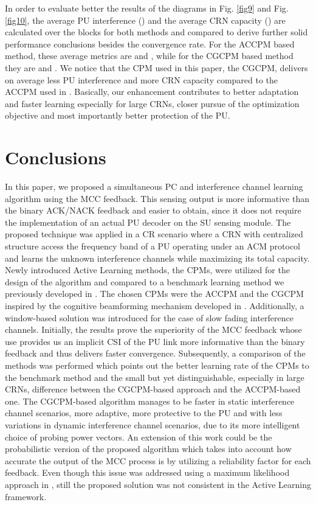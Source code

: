 \documentclass[journal]{IEEEtran}
\begin{document}
In order to evaluate better the results of the diagrams in Fig. \ref{fig9} and Fig. \ref{fig10}, the average PU interference () and the average CRN capacity () are calculated over the  blocks for both methods and compared to derive further solid performance conclusions besides the convergence rate. For the ACCPM based method, these average metrics are  and , while for the CGCPM based method they are  and . We notice that the CPM used in this paper, the CGCPM, delivers on average  less PU interference and  more CRN capacity compared to the ACCPM used in \cite{biban73}. Basically, our enhancement contributes to better adaptation and faster learning especially for large CRNs, closer pursue of the optimization objective and most importantly better protection of the PU.


\section{Conclusions}

In this paper, we proposed a simultaneous PC and interference channel learning algorithm using the MCC feedback. This sensing output is more informative than the binary ACK/NACK feedback and easier to obtain, since it does not require the implementation of an actual PU decoder on the SU sensing module. The proposed technique was applied in a CR scenario where a CRN with centralized structure access the frequency band of a PU operating under an ACM protocol and learns the unknown interference channels while maximizing its total capacity. Newly introduced Active Learning methods, the CPMs, were utilized for the design of the algorithm and compared to a benchmark learning method we previously developed in \cite{biban80}. The chosen CPMs were the ACCPM and the CGCPM inspired by the cognitive beamforming mechanism developed in \cite{biban73}. Additionally, a window-based solution was introduced for the case of slow fading interference channels. Initially, the results prove the superiority of the MCC feedback whose use provides us an implicit CSI of the PU link more informative than the binary feedback and thus delivers faster convergence. Subsequently, a comparison of the methods was performed which points out the better learning rate of the CPMs to the benchmark method and the small but yet distinguishable, especially in large CRNs, difference between the CGCPM-based approach and the ACCPM-based one. The CGCPM-based algorithm manages to be faster in static interference channel scenarios, more adaptive, more protective to the PU and with less variations in dynamic interference channel scenarios, due to its more intelligent choice of probing power vectors. An extension of this work could be the probabilistic version of the proposed algorithm which takes into account how accurate the output of the MCC process is by utilizing a reliability factor for each feedback. Even though this issue was addressed using a maximum likelihood approach in \cite{biban73}, still the proposed solution was not consistent in the Active Learning framework.







\end{document}
